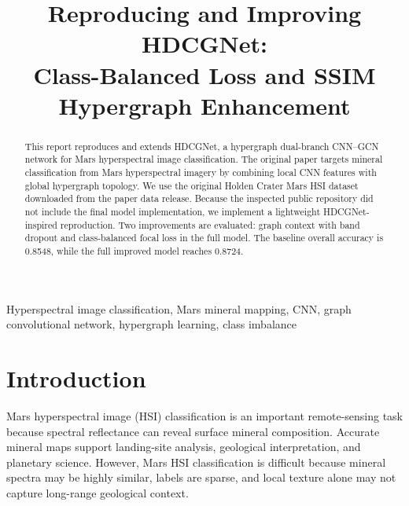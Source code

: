 \documentclass[conference]{IEEEtran}
\begin{document}
\pagestyle{plain}

\title{
    Reproducing and Improving HDCGNet:\\
    Class-Balanced Loss and SSIM Hypergraph Enhancement
}

\author{
}

\maketitle

\begin{abstract}
This report reproduces and extends HDCGNet, a hypergraph dual-branch CNN--GCN network for Mars hyperspectral image classification. The original paper targets mineral classification from Mars hyperspectral imagery by combining local CNN features with global hypergraph topology. We use the original Holden Crater Mars HSI dataset downloaded from the paper data release. Because the inspected public repository did not include the final model implementation, we implement a lightweight HDCGNet-inspired reproduction. Two improvements are evaluated: graph context with band dropout and class-balanced focal loss in the full model. The baseline overall accuracy is 0.8548, while the full improved model reaches 0.8724.
\end{abstract}

\begin{IEEEkeywords}
Hyperspectral image classification, Mars mineral mapping, CNN, graph convolutional network, hypergraph learning, class imbalance
\end{IEEEkeywords}

\section{Introduction}
Mars hyperspectral image (HSI) classification is an important remote-sensing task because spectral reflectance can reveal surface mineral composition. Accurate mineral maps support landing-site analysis, geological interpretation, and planetary science. However, Mars HSI classification is difficult because mineral spectra may be highly similar, labels are sparse, and local texture alone may not capture long-range geological context.
\end{document}
